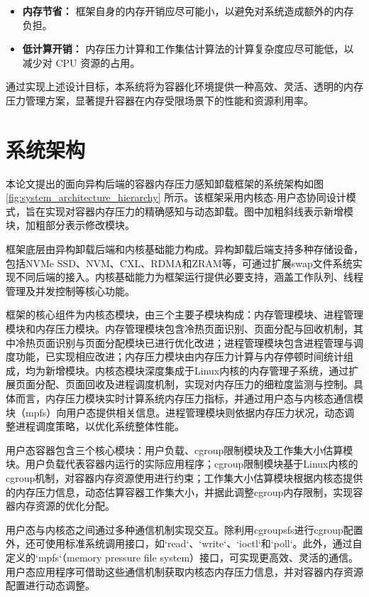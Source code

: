 \begin{itemize}
    \item \textbf{内存节省：} 框架自身的内存开销应尽可能小，以避免对系统造成额外的内存负担。
    \item \textbf{低计算开销：} 内存压力计算和工作集估计算法的计算复杂度应尽可能低，以减少对 CPU 资源的占用。
\end{itemize}


通过实现上述设计目标，本系统将为容器化环境提供一种高效、灵活、透明的内存压力管理方案，显著提升容器在内存受限场景下的性能和资源利用率。

\section{系统架构}

本论文提出的面向异构后端的容器内存压力感知卸载框架的系统架构如图 \ref{fig:system_architecture_hierarchy} 所示。该框架采用内核态-用户态协同设计模式，旨在实现对容器内存压力的精确感知与动态卸载。图中加粗斜线表示新增模块，加粗部分表示修改模块。

框架底层由异构卸载后端和内核基础能力构成。异构卸载后端支持多种存储设备，包括NVMe SSD、NVM、CXL、RDMA和ZRAM等，可通过扩展swap文件系统实现不同后端的接入。内核基础能力为框架运行提供必要支持，涵盖工作队列、线程管理及并发控制等核心功能。

框架的核心组件为内核态模块，由三个主要子模块构成：内存管理模块、进程管理模块和内存压力模块。内存管理模块包含冷热页面识别、页面分配与回收机制，其中冷热页面识别与页面分配模块已进行优化改进；进程管理模块包含进程管理与调度功能，已实现相应改进；内存压力模块由内存压力计算与内存停顿时间统计组成，均为新增模块。内核态模块深度集成于Linux内核的内存管理子系统，通过扩展页面分配、页面回收及进程调度机制，实现对内存压力的细粒度监测与控制。具体而言，内存压力模块实时计算系统内存压力指标，并通过用户态与内核态通信模块（mpfs）向用户态提供相关信息。进程管理模块则依据内存压力状况，动态调整进程调度策略，以优化系统整体性能。

用户态容器包含三个核心模块：用户负载、cgroup限制模块及工作集大小估算模块。用户负载代表容器内运行的实际应用程序；cgroup限制模块基于Linux内核的cgroup机制，对容器内存资源使用进行约束；工作集大小估算模块根据内核态提供的内存压力信息，动态估算容器工作集大小，并据此调整cgroup内存限制，实现容器内存资源的优化分配。

用户态与内核态之间通过多种通信机制实现交互。除利用cgroupsfs进行cgroup配置外，还可使用标准系统调用接口，如`read`、`write`、`ioctl`和`poll`。此外，通过自定义的`mpfs`（memory pressure file system）接口，可实现更高效、灵活的通信。用户态应用程序可借助这些通信机制获取内核态内存压力信息，并对容器内存资源配置进行动态调整。

